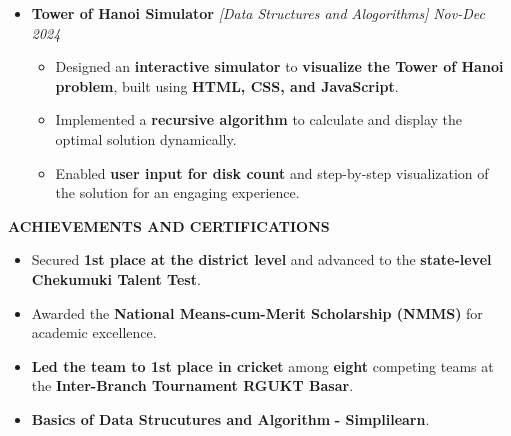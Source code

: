 \documentclass[a4paper,11pt]{article}
\newcommand{\resheading}[1]{{\small \colorbox{mygrey}{\begin{minipage}{0.975\textwidth}{\textbf{#1 \vphantom{p\^{E}}}}\end{minipage}}}}
\begin{document}
\begin{itemize}

\item {\bf Tower of Hanoi Simulator} 
\textit{[Data Structures and Alogorithms]}
\textit{\hfill {Nov-Dec 2024}}

\begin{itemize}

\vspace{-2mm}
\item Designed an \textbf{interactive simulator} to \textbf{visualize the Tower of Hanoi problem}, built using \textbf{HTML, CSS, and JavaScript}.
\item Implemented a \textbf{recursive algorithm} to calculate and display the optimal solution dynamically.
\item Enabled \textbf{user input for disk count} and step-by-step visualization of the solution for an engaging experience.

\vspace{-2mm}
\end{itemize}
\end{itemize}


\resheading{\textbf{ACHIEVEMENTS AND CERTIFICATIONS} }



	\begin{itemize}

\vspace{-0.1mm}
\item Secured \textbf{1st place at the district level} and advanced to the \textbf{state-level Chekumuki Talent Test}.
\vspace{-1.5mm}

\item Awarded the \textbf{National Means-cum-Merit Scholarship (NMMS)} for academic excellence.
\vspace{-1.5mm}

\item  \textbf{Led the team to 1st place in cricket} among \textbf{eight }competing teams at the \textbf{Inter-Branch Tournament RGUKT Basar}.
\vspace{-1.5mm}

\item  \textbf{Basics of Data Strucutures and Algorithm} \textbf{- Simplilearn}.
\vspace{-1.5mm}
\end{itemize}
\end{document}
